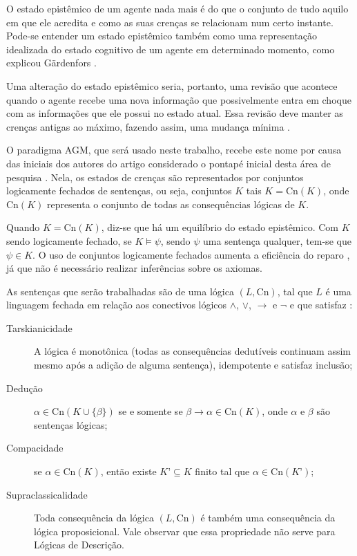 O estado epistêmico de um agente nada mais é do que o conjunto de tudo aquilo em que ele acredita e como as suas crenças se relacionam num certo instante. Pode-se entender um estado epistêmico também como uma representação idealizada do estado cognitivo de um agente em determinado momento, como explicou Gärdenfors \citep{revisaoGardenfors}.

Uma alteração do estado epistêmico seria, portanto, uma revisão que acontece quando o agente recebe uma nova informação que possivelmente entra em choque com as informações que ele possui no estado atual. Essa revisão deve manter as crenças antigas ao máximo, fazendo assim, uma mudança mínima \citep{logicaResina}.

O paradigma AGM, que será usado neste trabalho, recebe este nome por causa das iniciais dos autores do artigo considerado o pontapé inicial desta área de pesquisa  \citep{revisaoAGM}. Nela, os estados de crenças são representados por conjuntos logicamente fechados de sentenças, ou seja, conjuntos $ K $ tais $ K = \text{Cn}(K) $, onde $ \text{Cn}(K) $ representa o conjunto de todas as consequências lógicas de $ K $. 

Quando $ K = \text{Cn}(K) $, diz-se que há um equilíbrio do estado epistêmico. Com $ K $ sendo logicamente fechado, se $ K \models \psi $, sendo $ \psi $ uma sentença qualquer, tem-se que $ \psi \in K $. O uso de conjuntos logicamente fechados aumenta a eficiência do reparo \citep{revisaoHansson}, já que não é necessário realizar inferências sobre os axiomas.

As sentenças que serão trabalhadas são de uma lógica $ (L, \text{Cn}) $, tal que $ L $ é uma linguagem fechada em relação aos conectivos lógicos $ \land $, $ \lor $, $ \to $ e $ \lnot $ e que satisfaz \citep{revisaoRibeiro}:

\begin{description}
	\item[Tarskianicidade] A lógica é monotônica (todas as consequências dedutíveis continuam assim mesmo após a adição de alguma sentença), idempotente e satisfaz inclusão;
	\item[Dedução] $ \alpha \in \text{Cn}(K \cup \{\beta\}) $ se e somente se $ \beta \to \alpha \in \text{Cn}(K) $, onde $ \alpha $ e $ \beta $ são sentenças lógicas;
	\item[Compacidade] se $ \alpha \in \text{Cn}(K) $, então existe $ K’ \subseteq K $ finito tal que $ \alpha \in \text{Cn}(K’) $;
	\item[Supraclassicalidade] Toda consequência da lógica $ (L, \text{Cn}) $ é também uma consequência da lógica proposicional. Vale observar que essa propriedade não serve para Lógicas de Descrição.
\end{description} 

